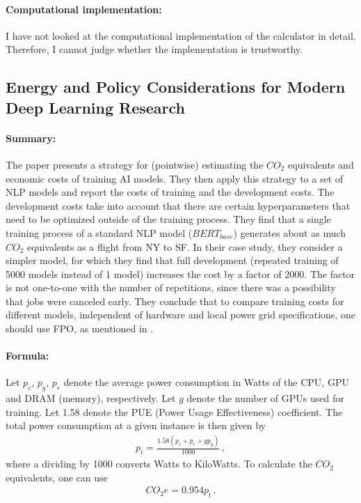 \paragraph{Computational implementation:} I have not looked at the computational
implementation of the calculator in detail. Therefore, I cannot judge whether the
implementation is trustworthy.


\subsection{Energy and Policy Considerations for Modern Deep Learning Research}
\label{seq:Strubell_2020}
\centerline{}
\vspace{1em}

\paragraph{Summary:} The paper presents a strategy for (pointwise) estimating the
$CO_2$ equivalents and economic costs of training AI models. They then apply this
strategy to a set of NLP models and report the costs of training and the development
costs. The development costs take into account that there are certain hyperparameters
that need to be optimized outside of the training process. They find that a single
training process of a standard NLP model ($BERT_{base}$) generates about as much $CO_2$
equivalents as a flight from NY to SF. In their case study, they consider a simpler
model, for which they find that full development (repeated training of 5000 models
instead of 1 model) increases the cost by a factor of 2000. The factor is not one-to-one
with the number of repetitions, since there was a possibility that jobs were canceled
early. They conclude that to compare training costs for different models, independent of
hardware and local power grid specifications, one should use FPO, as mentioned in
.

\paragraph{Formula:} Let $p_c$, $p_g$, $p_r$ denote the average power consumption in
Watts of the CPU, GPU and DRAM (memory), respectively. Let $g$ denote the number of GPUs
used for training. Let 1.58 denote the PUE (Power Usage Effectiveness) coefficient. The
total power consumption at a given instance is then given by
\begin{align}
    p_t = \frac{1.58 (p_c + p_r + g p_g)}{1000} \,,
\end{align}
where a dividing by 1000 converts Watts to KiloWatts. To calculate the $CO_2$
equivalents, one can use
\begin{align}
    CO_2e = 0.954 p_t \,.
\end{align}


